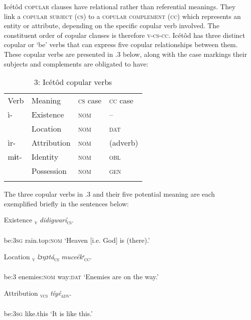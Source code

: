 Icétôd \textsc{copular} clauses have relational rather than referential meanings. They link a \textsc{copular subject} (\textsc{cs}) to a \textsc{copular} \textsc{complement} (\textsc{cc}) which represents an entity or attribute, depending on the specific copular verb involved. The constituent order of copular clauses is therefore \textsc{v-cs-cc}. Icétôd has three distinct copular or ‘be’ verbs that can express five copular relationships between them. These copular verbs are presented in .3 below, along with the case markings their subjects and complements are obligated to have:


\begin{table}
\caption{3: Icétôd copular verbs}
\label{tab:10}


\begin{tabularx}{\textwidth}{XXXX}
\lsptoprule

Verb & Meaning & \textsc{cs} case & \textsc{cc} case\\
ì- & Existence & \textsc{nom} & \textsc{–}\\
& Location & \textsc{nom} & \textsc{dat}\\
ìr- & Attribution & \textsc{nom} & (adverb)\\
mɨt- & Identity & \textsc{nom} & \textsc{obl}\\
& Possession & \textsc{nom} & \textsc{gen}\\
\lspbottomrule
\end{tabularx}
\end{table}
The three copular verbs in .3 and their five potential meaning are each exemplified briefly in the sentences below:




Existence
\ea\label{ex:}
\textsc{\textsubscript{v}}\textit{     didigwarí}\textsc{\textsubscript{cs}}. \\
    \\
be:\textsc{3sg}   rain.top:\textsc{nom}
\glt ‘Heaven [i.e. God] is (there).’ 
\z




Location
\ea\label{ex:}
\textsc{\textsubscript{v}}\textit{   lɔŋɔtá}\textsc{\textsubscript{cs}}\textit{     muceékᵉ}\textsc{\textsubscript{cc}}. \\
    \\
be:3   enemies:\textsc{nom}   way:\textsc{dat}
\glt ‘Enemies are on the way.’ 
\z




Attribution
\ea\label{ex:}
\textsc{\textsubscript{vcs}}\textit{     tíyé}\textsc{\textsubscript{adv}}. \\
    \\
be:\textsc{3sg}   like.this
\glt ‘It is like this.’ 
\z




